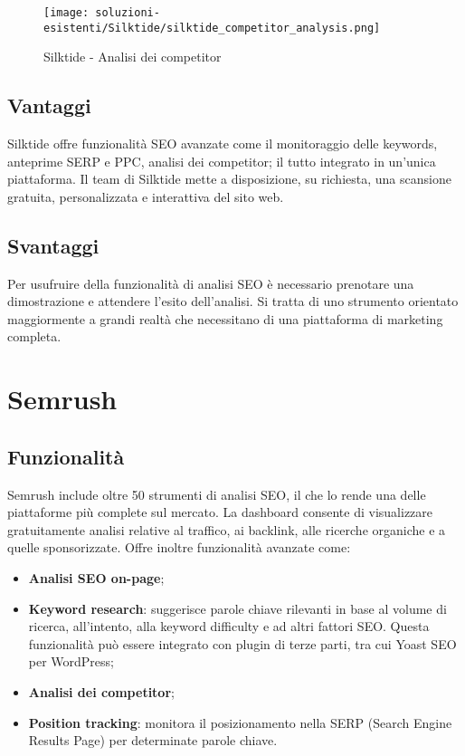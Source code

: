 \begin{figure}[H]
    \centering 
    \texttt{[image: soluzioni-esistenti/Silktide/silktide\_competitor\_analysis.png]} 
    \caption{Silktide - Analisi dei competitor}
\end{figure}

\subsection{Vantaggi}
\par Silktide offre funzionalità SEO avanzate come il monitoraggio delle keywords, anteprime SERP e PPC, analisi dei competitor; il tutto integrato in un'unica piattaforma. Il team di Silktide mette a disposizione, su richiesta, una scansione gratuita, personalizzata e interattiva del sito web.

\subsection{Svantaggi}
\par Per usufruire della funzionalità di analisi SEO è necessario prenotare una dimostrazione e attendere l'esito dell'analisi. Si tratta di uno strumento orientato maggiormente a grandi realtà che necessitano di una piattaforma di marketing completa.

\section{Semrush}

\subsection{Funzionalità}
\par Semrush include oltre 50 strumenti di analisi SEO, il che lo rende una delle piattaforme più complete sul mercato. La dashboard consente di visualizzare gratuitamente analisi relative al traffico, ai backlink, alle ricerche organiche e a quelle sponsorizzate. Offre inoltre funzionalità avanzate come:
\begin{itemize}
    \item \textbf{Analisi SEO on-page};
    \item \textbf{Keyword research}: suggerisce parole chiave rilevanti in base al volume di ricerca, all'intento, alla keyword difficulty e ad altri fattori SEO. Questa funzionalità può essere integrato con plugin di terze parti, tra cui Yoast SEO per WordPress;
    \item \textbf{Analisi dei competitor};
    \item \textbf{Position tracking}: monitora il posizionamento nella SERP (Search Engine Results Page) per determinate parole chiave.
\end{itemize}

